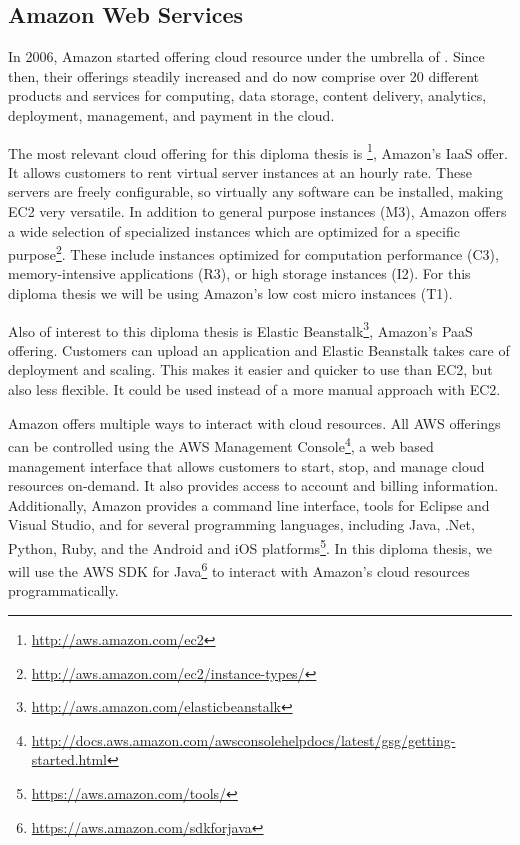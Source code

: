 \subsection{Amazon Web Services}

In 2006, Amazon started offering cloud resource under the umbrella of .
Since then, their offerings steadily increased and do now comprise over 20 different products and services for computing, data storage, content delivery, analytics, deployment, management, and payment in the cloud.

The most relevant cloud offering for this diploma thesis is \footnote{\url{http://aws.amazon.com/ec2}}, Amazon's IaaS offer.
It allows customers to rent virtual server instances at an hourly rate.
These servers are freely configurable, so virtually any software can be installed, making EC2 very versatile.
In addition to general purpose instances (M3), Amazon offers a wide selection of specialized instances which are optimized for a specific purpose\footnote{\url{http://aws.amazon.com/ec2/instance-types/}}.
These include instances optimized for computation performance (C3), memory-intensive applications (R3), or high storage instances (I2).
For this diploma thesis we will be using Amazon's low cost micro instances (T1).

Also of interest to this diploma thesis is Elastic Beanstalk\footnote{\url{http://aws.amazon.com/elasticbeanstalk}}, Amazon's PaaS offering.
Customers can upload an application and Elastic Beanstalk takes care of deployment and scaling.
This makes it easier and quicker to use than EC2, but also less flexible.
It could be used instead of a more manual approach with EC2.

Amazon offers multiple ways to interact with cloud resources.
All AWS offerings can be controlled using the AWS Management Console\footnote{\url{http://docs.aws.amazon.com/awsconsolehelpdocs/latest/gsg/getting-started.html}}, a web based management interface that allows customers to start, stop, and manage cloud resources on-demand.
It also provides access to account and billing information.
Additionally, Amazon provides a command line interface, tools for Eclipse and Visual Studio, and  for several programming languages, including Java, .Net, Python, Ruby, and the Android and iOS platforms\footnote{\url{https://aws.amazon.com/tools/}}.
In this diploma thesis, we will use the AWS SDK for Java\footnote{\url{https://aws.amazon.com/sdkforjava}} to interact with Amazon's cloud resources programmatically.
